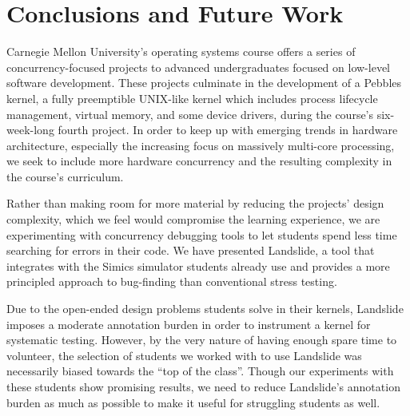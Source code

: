 \section{Conclusions and Future Work}
\label{sec:future}

Carnegie Mellon University's operating systems course offers a series of concurrency-focused projects to advanced undergraduates focused on low-level software development.
These projects culminate in the development of a Pebbles kernel, a fully preemptible UNIX-like kernel which includes process lifecycle management, virtual memory, and some device drivers, during the course's six-week-long fourth project.
In order to keep up with emerging trends in hardware architecture, especially the increasing focus on massively multi-core processing, we seek to include more hardware concurrency and the resulting complexity in the course's curriculum.



Rather than making room for more material by reducing the projects' design complexity, which we feel would compromise the learning experience, we are experimenting with concurrency debugging tools to let students spend less time searching for errors in their code.
We have presented Landslide, a tool that integrates with the Simics simulator students already use and provides a more principled approach to bug-finding than conventional stress testing.

Due to the open-ended design problems students solve in their kernels, Landslide imposes a moderate annotation burden in order to instrument a kernel for systematic testing.
However, by the very nature of having enough spare time to volunteer, the selection of students we worked with to use Landslide was necessarily biased towards the ``top of the class''.
Though our experiments with these students show promising results, we need to reduce Landslide's annotation burden as much as possible to make it useful for struggling students as well.

